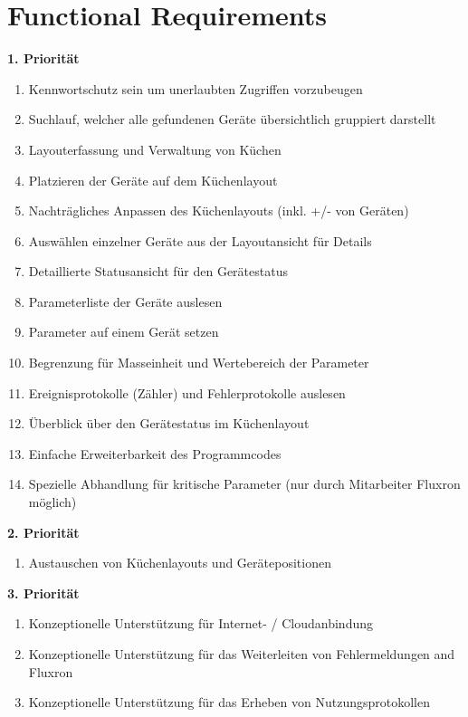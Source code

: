 
\section{Functional Requirements}
\label{sec:Functional Requirements}

\textbf{1. Priorität}
\begin{enumerate}
		\item Kennwortschutz sein um unerlaubten Zugriffen vorzubeugen
        \item Suchlauf, welcher alle gefundenen Geräte übersichtlich gruppiert darstellt
        \item Layouterfassung und Verwaltung von Küchen
        \item Platzieren der Geräte auf dem Küchenlayout
        \item Nachträgliches Anpassen des Küchenlayouts (inkl. +/- von Geräten)
        \item Auswählen einzelner Geräte aus der Layoutansicht für Details
        \item Detaillierte Statusansicht für den Gerätestatus
        \item Parameterliste der Geräte auslesen
		\item Parameter auf einem Gerät setzen
		\item Begrenzung für Masseinheit und Wertebereich der Parameter
        \item Ereignisprotokolle (Zähler) und Fehlerprotokolle auslesen
        \item Überblick über den Gerätestatus im Küchenlayout
        \item Einfache Erweiterbarkeit des Programmcodes
        \item Spezielle Abhandlung für kritische Parameter (nur durch Mitarbeiter Fluxron möglich)
	\end{enumerate}
\textbf{2. Priorität}
	\begin{enumerate}[resume]
        \item Austauschen von Küchenlayouts und Gerätepositionen
	\end{enumerate}
\textbf{3. Priorität}
	\begin{enumerate}[resume]
		\item Konzeptionelle Unterstützung für Internet- / Cloudanbindung
        \item Konzeptionelle Unterstützung für das Weiterleiten von Fehlermeldungen and Fluxron
        \item Konzeptionelle Unterstützung für das Erheben von Nutzungsprotokollen
\end{enumerate}
